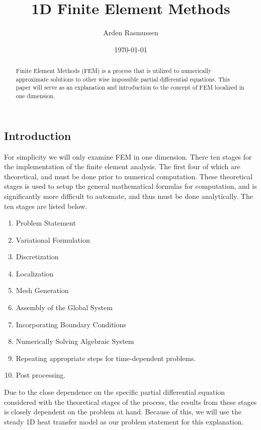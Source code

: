 \documentclass[10pt]{amsart}
\title{1D Finite Element Methods}
\author{Arden Rasmussen}
\date{\today}
\numberwithin{equation}{section}
\theoremstyle{definition}
\begin{document}
\maketitle
\begin{abstract}
  Finite Element Methods (FEM) is a process that is utilized to numerically
  approximate solutions to other wise impossible partial differential equations.
  This paper will serve as an explanation and introduction to the concept of
  FEM localized in one dimension.
\end{abstract}

\begin{multicols}{2}

  \section{Introduction}%
  \label{sec:introduction}

  For simplicity we will only examine FEM in one dimension. There ten stages for
  the implementation of the finite element analysis. The first four of which are
  theoretical, and must be done prior to numerical computation. These theoretical
  stages is used to setup the general mathematical formulas for computation, and
  is significantly more difficult to automate, and thus must be done
  analytically. The ten stages are listed below.

  \begin{enumerate}[label=(\roman*)]
    \item Problem Statement
    \item Variational Formulation
    \item Discretization
    \item Localization
    \item Mesh Generation
    \item Assembly of the Global System
    \item Incorporating Boundary Conditions
    \item Numerically Solving Algebraic System
    \item Repeating appropriate steps for time-dependent problems.
    \item Post processing.
  \end{enumerate}

  Due to the close dependence on the specific partial differential equation
  considered with the theoretical stages of the process, the results from these
  stages is closely dependent on the problem at hand. Because of this, we will use
  the steady 1D heat transfer model as our problem statement for this
  explanation.


\end{multicols}
\end{document}
